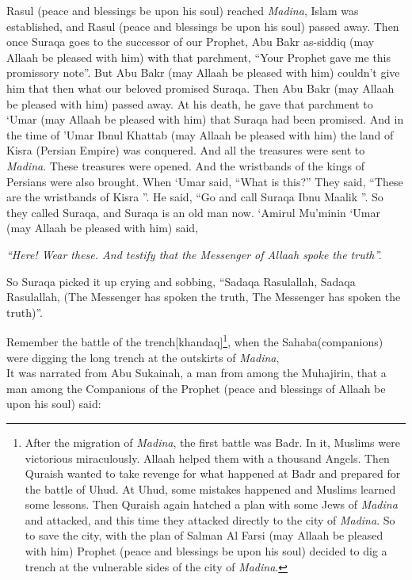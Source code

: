 {Rasul (peace and blessings be upon his soul) reached \textit{Madina}, Islam was established, and Rasul (peace and blessings be upon his soul) passed away. Then once Suraqa goes to the successor of our Prophet, Abu Bakr as-siddiq (may Allaah be pleased with him) with that parchment, “Your Prophet gave me this promissory note”. But Abu Bakr (may Allaah be pleased with him) couldn’t give him that then what our beloved promised Suraqa. Then Abu Bakr (may Allaah be pleased with him) passed away. At his death, he gave that parchment to ‘Umar (may Allaah be pleased with him) that Suraqa had been promised. And in the time of 'Umar Ibnul Khattab (may Allaah be pleased with him) the land of Kisra (Persian Empire) was conquered. And all the treasures were sent to \textit{Madina}. These treasures were opened. And the wristbands of the kings of Persians were also brought. When ‘Umar said, “What is this?” They said, “These are the wristbands of Kisra ”. He said, “Go and call Suraqa Ibnu Maalik ''. So they called Suraqa, and Suraqa is an old man now. ‘Amirul Mu’minin ‘Umar (may Allaah be pleased with him) said,
\begin{center}
    \textit{“Here! Wear these. And testify that the Messenger of Allaah spoke the truth”.}
\end{center}
So Suraqa picked it up crying and sobbing, “Sadaqa Rasulallah, Sadaqa Rasulallah, (The Messenger has spoken the truth, The Messenger has spoken the truth)”. 

Remember the battle of the trench[khandaq]\footnote{After the migration of \textit{Madina}, the first battle was Badr. In it, Muslims were victorious miraculously. Allaah helped them with a thousand Angels. Then Quraish wanted to take revenge for what happened at Badr and prepared for the battle of Uhud. At Uhud, some mistakes happened and Muslims learned some lessons. Then Quraish again hatched a plan with some Jews of \textit{Madina} and attacked, and this time they attacked directly to the city of \textit{Madina}. So to save the city, with the plan of Salman Al Farsi (may Allaah be pleased with him) Prophet (peace and blessings be upon his soul) decided to dig a trench at the vulnerable sides of the city of \textit{Madina}. 
}, when the Sahaba(companions) were digging the long trench at the outskirts of \textit{Madina},\\
It was narrated from Abu Sukainah, a man from among the Muhajirin, that a man among the Companions of the Prophet (peace and blessings of Allaah be upon his soul) said:
}
